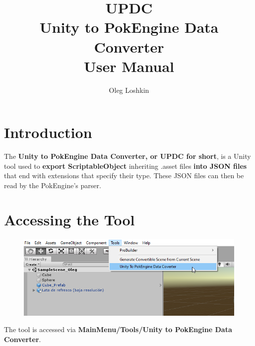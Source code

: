 \documentclass[10pt,a4paper]{article}
\author{Oleg Loshkin}
\title{\textbf{UPDC}\\Unity to PokEngine Data Converter\\\textbf{User Manual}}
\begin{document}
\maketitle
\section{Introduction}
The \textbf{Unity to PokEngine Data Converter, or UPDC for short}, is a Unity tool used to \textbf{export ScriptableObject} inheriting .asset files \textbf{into JSON files} that end with extensions that specify their type. These JSON files can then be read by the PokEngine's parser.

\section{Accessing the Tool}
\begin{figure}[h]
\includegraphics[width=\textwidth]{mainMenu}
\end{figure}
\noindent The tool is accessed via \textbf{MainMenu/Tools/Unity to PokEngine Data Converter}.
\newpage
\end{document}
